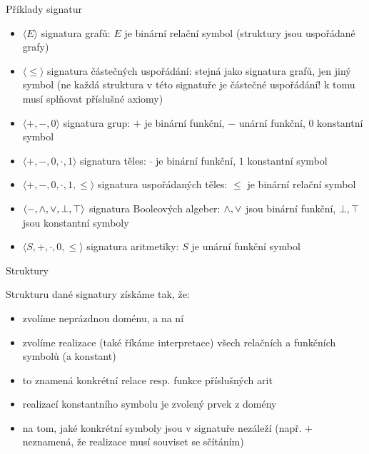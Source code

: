 \documentclass{beamer}
\begin{document}
\begin{frame}{Příklady signatur}

    \begin{itemize}
        \item \alert{$\langle E \rangle$} signatura \alert{grafů}: $E$ je binární relační symbol (struktury jsou uspořádané grafy)
        \item \alert{$\langle \leq \rangle$} signatura \alert{částečných uspořádání}: stejná jako signatura grafů, jen jiný symbol (ne každá struktura v této signatuře je částečné uspořádání! k tomu musí splňovat příslušné \alert{axiomy})
        \item \alert{$\langle +, -, 0\rangle$} signatura \alert{grup}: $+$ je binární funkční, $-$ unární funkční, $0$ konstantní symbol
        \item \alert{$\langle +, -, 0,\cdot,1\rangle$} signatura \alert{těles}: $\cdot$ je binární funkční, $1$ konstantní symbol
        \item \alert{$\langle +, -, 0,\cdot,1,\leq\rangle$} signatura \alert{uspořádaných těles}: $\leq$ je binární relační symbol
        \item \alert{$\langle -,{\land},{\lor},\bot,\top\rangle$} signatura \alert{Booleových algeber}: ${\land},{\lor}$ jsou binární funkční, $\bot,\top$ jsou konstantní symboly
        \item \alert{$\langle S,+,\cdot,0,\leq\rangle$} signatura \alert{aritmetiky}: $S$ je unární funkční symbol
    \end{itemize}
    
\end{frame}


\begin{frame}{Struktury}

    \alert{Strukturu} dané signatury získáme tak, že:
    \begin{itemize}
        \item zvolíme neprázdnou \alert{doménu}, a na ní
        \item zvolíme \alert{realizace} (také říkáme \alert{interpretace}) všech relačních a funkčních symbolů (a konstant)
        \item to znamená \alert{konkrétní} relace resp. funkce příslušných arit
        \item realizací konstantního symbolu je zvolený prvek z domény
        \item na tom, jaké konkrétní symboly jsou v signatuře nezáleží (např. $+$ neznamená, že realizace musí souviset se sčítáním)
    \end{itemize}

\end{frame}
\end{document}
